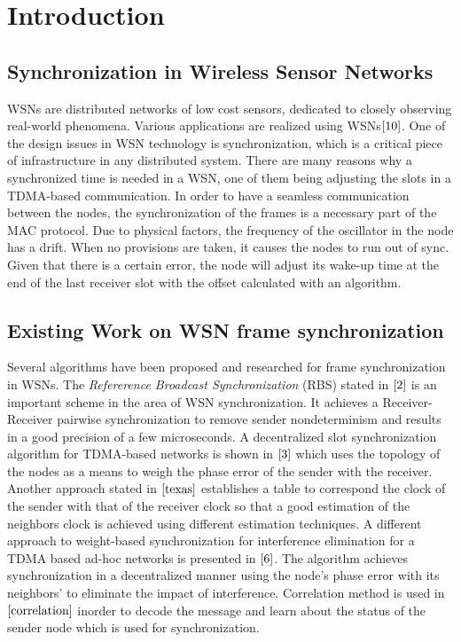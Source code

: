 \documentclass[journal]{IEEEtran}
\begin{document}
\section{\textbf{Introduction}}
\subsection{\textbf{Synchronization in Wireless Sensor Networks}}
\noindent WSNs are distributed networks of low cost sensors, dedicated to closely observing real-world phenomena. Various applications are realized using WSNs$\cite{10}$. One of the design issues in WSN technology is synchronization, which is a critical piece of infrastructure in any distributed system. There are many reasons why a synchronized time is needed in a WSN, one of them being adjusting the slots in a TDMA-based communication. \newline
In order to have a seamless communication between the nodes, the synchronization of the frames is a necessary part of the MAC
protocol. Due to physical factors, the frequency of the oscillator in the node has a drift. When no provisions are taken, it causes the nodes to run out of sync. Given that there is a certain error, the node will adjust its wake-up time at the end of the last receiver slot with the offset calculated with an algorithm. 
\subsection{\textbf{Existing Work on WSN frame synchronization}}
\noindent Several algorithms have been proposed and researched for frame synchronization in WSNs. The \textit{Refererence Broadcast Synchronization} (RBS) stated in $\cite{2}$ is an important scheme in the area of WSN synchronization. It achieves a Receiver-Receiver pairwise synchronization to remove sender nondeterminism and results in a good precision of a few microseconds. A decentralized slot synchronization algorithm  for TDMA-based networks is shown in $\cite{3}$ which uses the topology of the nodes as a means to weigh the phase error of the sender with the receiver. \newline 
Another approach stated in $\cite{texas}$ establishes a table to correspond the clock of the sender with that of the receiver clock so that a good estimation of the neighbors clock is achieved using different estimation techniques. A different approach to weight-based synchronization for interference elimination for a TDMA based ad-hoc networks is presented in $\cite{6}$. The algorithm achieves synchronization in a decentralized manner using the node's phase error with its neighbors' to eliminate the impact of interference. Correlation method is used in $\cite{correlation}$ inorder to decode the message and learn about the status of the sender node which is used for synchronization.
\end{document}
